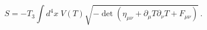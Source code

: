 \begin{equation}\label{fa}
S= -T_3 \int d^4x\; V(T) \sqrt{-\det (\eta_{\mu\nu} +
\partial_\mu T\partial_\nu T + F_{\mu\nu})}\, .
\end{equation}

